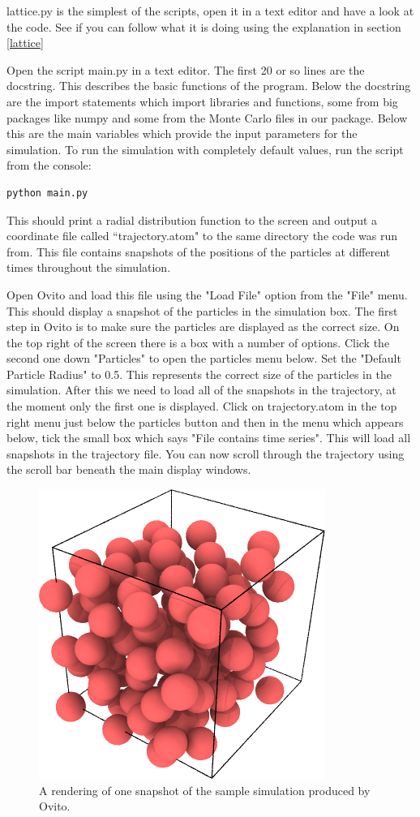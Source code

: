 	\begin{task}lattice.py is the simplest of the scripts, open it in a text editor and have a look at the code. See if you can follow what it is doing using the explanation in section \ref{lattice}\end{task}

	Open the script main.py in a text editor. The first 20 or so lines are the docstring. This describes the basic functions of the program. Below the docstring are the import statements which import libraries and functions, some from big packages like numpy and some from the Monte Carlo files in our package. Below this are the main variables which provide the input parameters for the simulation.  To run the simulation with completely default values, run the script from the console:
\begin{lstlisting}	
python main.py\end{lstlisting}

This should print a radial distribution function to the screen and output a coordinate file called ``trajectory.atom" to the same directory the code was run from. This file contains snapshots of the positions of the particles at different times throughout the simulation. 

Open Ovito and load this file using the "Load File" option from the "File" menu. This should display a snapshot of the particles in the simulation box. The first step in Ovito is to make sure the particles are displayed as the correct size. On the top right of the screen there is a box with a number of options. Click the second one down "Particles" to open the particles menu below. Set the "Default Particle Radius" to 0.5. This represents the correct size of the particles in the simulation. After this we need to load all of the snapshots in the trajectory, at the moment only the first one is displayed. Click on trajectory.atom in the top right menu just below the particles button and then in the menu which appears below, tick the small box which says "File contains time series". This will load all snapshots in the trajectory file. You can now scroll through the trajectory using the scroll bar beneath the main display windows. 

	\begin{figure}[h]
		\centering
		\includegraphics[scale=0.6]{images/example_render}
		\caption{A rendering of one snapshot of the sample simulation produced by Ovito.}
		\label{fig:ovitosample}
	\end{figure}